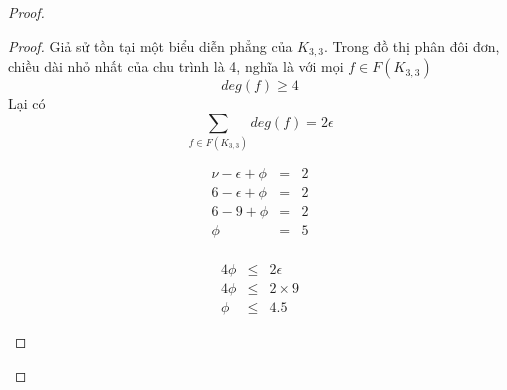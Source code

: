 \begin{proof}
\begin{proof}
        Giả sử tồn tại một biểu diễn phẳng của $K_{3,3}$. Trong đồ thị phân đôi đơn, chiều dài nhỏ nhất của chu trình là 4, nghĩa là với mọi $f \in F(K_{3,3})$
        $$deg(f) \geq 4$$
        Lại có $$\sum_{f \in F(K_{3,3})}deg(f) = 2\epsilon$$
        \begin{figure}[H]
            \begin{minipage}{0.3\textwidth}
                \begin{eqnarray*}
                    \nu-\epsilon+\phi& = &2 \\
                    6-\epsilon+\phi& = & 2\\
                    6-9+\phi& = & 2\\
                    \phi& = & 5\\
                \end{eqnarray*}
            \end{minipage}
            \hfill
            \begin{minipage}{0.35\textwidth}
                \centering
            \end{minipage}
            \hfill
            \begin{minipage}{0.3\textwidth}
                \centering
                \begin{eqnarray*}
                    4\phi& \leq &2\epsilon\\
                    4\phi& \leq & 2 \times 9\\
                    \phi& \leq & 4.5
                \end{eqnarray*}
            \end{minipage}
        \end{figure}
    \end{proof}


\end{proof}
